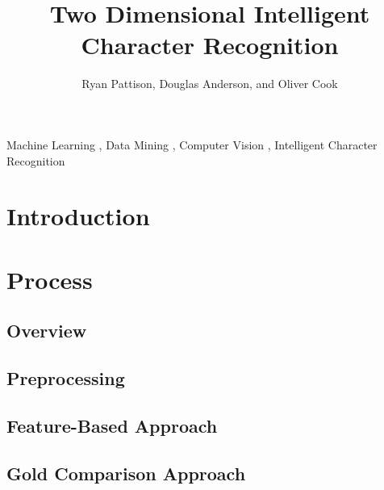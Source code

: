 \documentclass[preprint,3p,12pt]{elsarticle}
\begin{document}
\begin{frontmatter}

\title{Two Dimensional Intelligent Character Recognition}


\author[ryan,doug,oliver]{Ryan Pattison, Douglas Anderson, and Oliver Cook}
\address[ryan]{ryan.m.pattison@gmail.com}
\address[doug]{dander01@uoguelph.ca}
\address[oliver]{cooko@uoguelph.ca}


\begin{abstract}

\end{abstract}

\begin{keyword}
Machine Learning \sep
Data Mining \sep
Computer Vision \sep
Intelligent Character Recognition
\end{keyword}

\end{frontmatter}

\section{Introduction}
\label{intro}



\section{Process}
\label{process}

\subsection{Overview}
\label{process:overview}



\subsection{Preprocessing}
\label{process:preprocessing}



\subsection{Feature-Based Approach}
\label{process:featurebased}



\subsection{Gold Comparison Approach}
\end{document}
